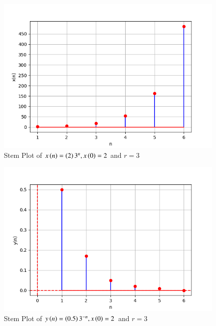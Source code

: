 \documentclass[journal,12pt,twocolumn]{IEEEtran}
\begin{document}
\begin{figure}[ht]
   \centering
   \includegraphics[width=1\columnwidth]{figs/plot2.png}
   \caption{Stem Plot of $x\left(n\right) = \left(2\right)3^{n} , x\left(0\right) = 2$ and $r = 3$}
   \label{fig: 1.11.9.1.1}
\end{figure}

\begin{figure}[ht]
   \centering
   \includegraphics[width=1\columnwidth]{figs/plot3.png}
   \caption{Stem Plot of $y\left(n\right) = \left(0.5\right)3^{-n} , x\left(0\right) = 2$ and $r = 3$}
   \label{fig: 1.11.9.1.1}
\end{figure}
\end{document}
